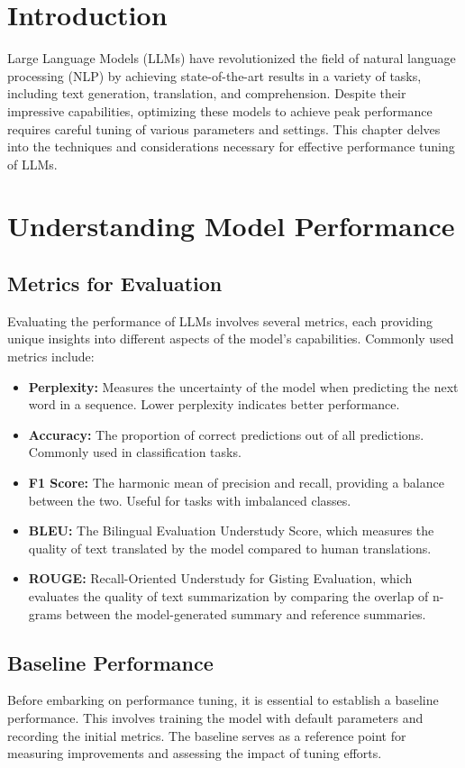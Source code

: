 \section{Introduction}
Large Language Models (LLMs) have revolutionized the field of natural language processing (NLP) by achieving state-of-the-art results in a variety of tasks, including text generation, translation, and comprehension. Despite their impressive capabilities, optimizing these models to achieve peak performance requires careful tuning of various parameters and settings. This chapter delves into the techniques and considerations necessary for effective performance tuning of LLMs.

\section{Understanding Model Performance}
\subsection{Metrics for Evaluation}
Evaluating the performance of LLMs involves several metrics, each providing unique insights into different aspects of the model's capabilities. Commonly used metrics include:

\begin{itemize}
    \item \textbf{Perplexity:} Measures the uncertainty of the model when predicting the next word in a sequence. Lower perplexity indicates better performance.
    \item \textbf{Accuracy:} The proportion of correct predictions out of all predictions. Commonly used in classification tasks.
    \item \textbf{F1 Score:} The harmonic mean of precision and recall, providing a balance between the two. Useful for tasks with imbalanced classes.
    \item \textbf{BLEU:} The Bilingual Evaluation Understudy Score, which measures the quality of text translated by the model compared to human translations.
    \item \textbf{ROUGE:} Recall-Oriented Understudy for Gisting Evaluation, which evaluates the quality of text summarization by comparing the overlap of n-grams between the model-generated summary and reference summaries.
\end{itemize}

\subsection{Baseline Performance}
Before embarking on performance tuning, it is essential to establish a baseline performance. This involves training the model with default parameters and recording the initial metrics. The baseline serves as a reference point for measuring improvements and assessing the impact of tuning efforts.

